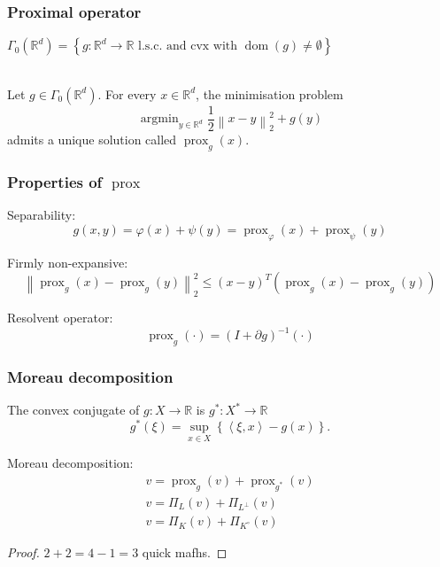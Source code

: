 \documentclass[aspectratio=169]{beamer}
\DeclareMathOperator{\Prox}{prox}
\newcommand{\prox}[2]{\Prox_{#1}\left({#2}\right)}
\newcommand{\RR}{\mathbb{R}}
\newcommand{\rd}{\mathbb{R}^d}
\newcommand{\normtwosq}[1]{\left\|#1\right\|_2^2}
\renewcommand{\phi}{\varphi}
\DeclareMathOperator*{\argmin}{argmin}
\DeclareMathOperator{\dom}{dom}
\begin{document}
		\begin{frame}
		\frametitle{Proximal operator}
		$\Gamma_0(\rd) = \left\{g:\rd\to\RR\text{ l.s.c. and cvx with } \dom(g)\ne\emptyset\right\}$
		\quad \\ \quad \\
		\begin{definition}
		Let $g\in\Gamma_0(\rd)$. For every $x \in \rd$, the minimisation problem
		\begin{equation}
		\nonumber
		\argmin_{y\in\rd} \frac{1}{2}\normtwosq{x-y} + g(y)
		\end{equation}
		admits a unique solution called $\prox{g}{x}$.
		\end{definition}
		\end{frame}

		\begin{frame}
		\frametitle{Properties of $\Prox$}
		Separability:
		\begin{equation}
		\nonumber g(x,y) = \phi(x)+\psi(y) = \prox{\phi}{x} + \prox{\psi}{y}
		\end{equation}
		
		{Firmly non-expansive}:
		\begin{equation}
		\nonumber \normtwosq{\prox{g}{x}-\prox{g}{y}} \le \left(x-y\right)^T\left(\prox{g}{x} - \prox{g}{y}\right)
		\end{equation}
		
		Resolvent operator: 
		\begin{equation}
		\nonumber \prox{g}{\cdot} = \left(I + \partial g\right)^{-1} (\cdot)
		\end{equation}
		\end{frame}
		
		\begin{frame}
		\frametitle{Moreau decomposition}
		\begin{definition}
		The convex conjugate of $g:X\to\RR$ is $g^*:X^*\to\RR$
		\begin{equation}
		\nonumber
		g^*(\xi) = \sup_{x\in X}\left\{\left<\xi,x\right>-g(x)\right\}.
		\end{equation}
		\end{definition}		
		\pause
		{Moreau decomposition}:
		\begin{gather}
		\nonumber v = \prox{g}{v} + \prox{g^*}{v}\\
		\nonumber v = \Pi_L(v) + \Pi_{L^\perp}(v)\\
		\nonumber v = \Pi_K(v) + \Pi_{K^\circ}(v)
		\end{gather}
		\begin{proof}
		$2+2=4-1=3$ quick mafhs.
		\end{proof}
		\end{frame}
		
\end{document}
